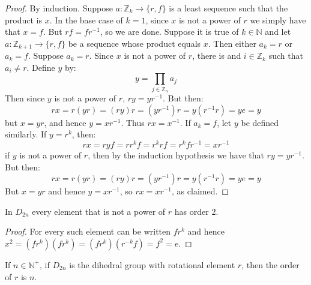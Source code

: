     \begin{proof}
        By induction. Suppose $a:\mathbb{Z}_{k}\rightarrow\{r,f\}$ is
        a least sequence such that the product is $x$. In the base case
        of $k=1$, since $x$ is not a power of $r$ we simply have that
        $x=f$. But $rf=fr^{\minus{1}}$, so we are done. Suppose it is
        true of $k\in\mathbb{N}$ and let
        $a:\mathbb{Z}_{k+1}\rightarrow\{r,f\}$ be a sequence whose
        product equals $x$. Then either $a_{k}=r$ or $a_{k}=f$. Suppose
        $a_{k}=r$. Since $x$ is not a power of $r$, there is and
        $i\in\mathbb{Z}_{k}$ such that $a_{i}\ne{r}$. Define $y$ by:
        \begin{equation}
            y=\prod_{j\in\mathbb{Z}_{n}}a_{j}
        \end{equation}
        Then since $y$ is not a power of $r$, $ry=yr^{\minus{1}}$. But
        then:
        \begin{equation}
            rx=r(yr)=(ry)r=(yr^{\minus{1}})r=y(r^{\minus{1}}r)=ye=y
        \end{equation}
        but $x=yr$, and hence $y=xr^{\minus{1}}$. Thus
        $rx=x^{\minus{1}}$. If $a_{k}=f$, let $y$ be defined similarly.
        If $y=r^{k}$, then:
        \begin{equation}
            rx=ryf=rr^{k}f=r^{k}rf=r^{k}fr^{\minus{1}}=xr^{\minus{1}}
        \end{equation}
        if $y$ is not a power of $r$, then by the induction hypothesis
        we have that $ry=yr^{\minus{1}}$. But then:
        \begin{equation}
            rx=r(yr)=(ry)r=(yr^{\minus{1}})r=y(r^{\minus{1}}r)=ye=y
        \end{equation}
        But $x=yr$ and hence $y=xr^{\minus{1}}$, so $rx=xr^{\minus{1}}$,
        as claimed.
    \end{proof}
    \begin{theorem}
        In $D_{2n}$ every element that is not a power of $r$ has order
        2.
    \end{theorem}
    \begin{proof}
        For every such element can be written $fr^{k}$ and hence
        $x^{2}=(fr^{k})(fr^{k})=(fr^{k})(r^{\minus{k}}f)=f^{2}=e$.
    \end{proof}
    \begin{theorem}
        If $n\in\mathbb{N}^{+}$, if $D_{2n}$ is the dihedral group with
        rotational element $r$, then the order of $r$ is $n$.
    \end{theorem}
